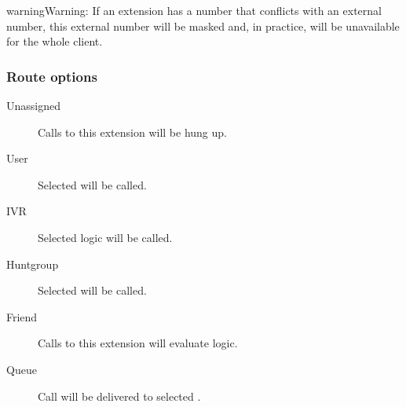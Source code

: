 \documentclass[letterpaper,10pt,english]{sphinxmanual}
\begin{document}
\begin{notice}{warning}{Warning:}
If an extension has a number that conflicts with an external
number, this external number will be masked and, in practice, will be
unavailable for the whole client.
\end{notice}


\subsubsection{Route options}
\label{administration_portal/client/vpbx/extensions:route-options}\begin{description}
\item[{Unassigned}] \leavevmode{}\label{administration_portal/client/vpbx/extensions:term-unassigned}
Calls to this extension will be hung up.

\item[{User}] \leavevmode{}\label{administration_portal/client/vpbx/extensions:term-user}
Selected {\hyperref[administration_portal/client/vpbx/users:users]{}} will be called.

\item[{IVR}] \leavevmode{}\label{administration_portal/client/vpbx/extensions:term-ivr}
Selected {\hyperref[administration_portal/client/vpbx/routing_endpoints/ivrs:ivrs]{}} logic will be called.

\item[{Huntgroup}] \leavevmode{}\label{administration_portal/client/vpbx/extensions:term-huntgroup}
Selected {\hyperref[administration_portal/client/vpbx/routing_endpoints/hunt_groups:huntgroups]{}} will be called.

\item[{Friend}] \leavevmode{}\label{administration_portal/client/vpbx/extensions:term-friend}
Calls to this extension will evaluate {\hyperref[administration_portal/client/vpbx/routing_endpoints/friends/index:friends]{}} logic.

\item[{Queue}] \leavevmode{}\label{administration_portal/client/vpbx/extensions:term-queue}
Call will be delivered to selected {\hyperref[administration_portal/client/vpbx/routing_endpoints/queues:queues]{}}.


\end{description}
\end{document}
